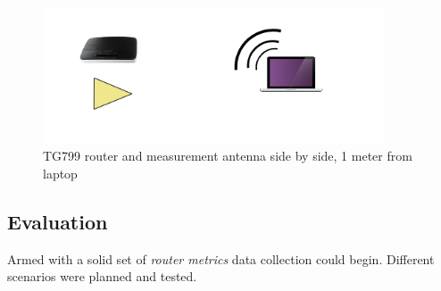 \begin{figure}
\center
\includegraphics[width=0.9\textwidth]{images/rssi_setup.png}
\caption{TG799 router and measurement antenna side by side, 1 meter from laptop}
\label{fig:rssi_setup}
\end{figure}

\subsection{Evaluation}

Armed with a solid set of \emph{router metrics} data collection could begin.
Different scenarios were planned and tested.